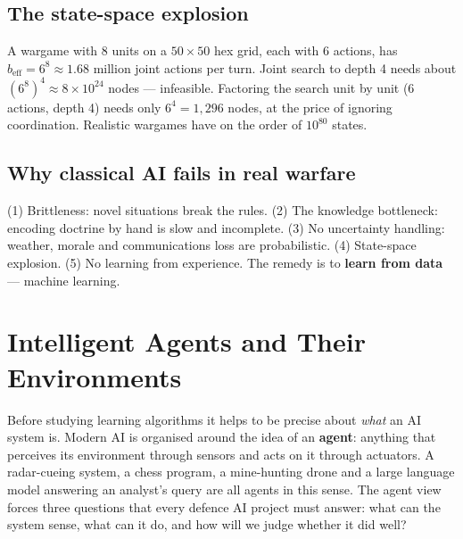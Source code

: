 \documentclass[11pt]{article}
\begin{document}
\subsection{The state-space explosion}
A wargame with 8 units on a $50\times50$ hex grid, each with 6 actions, has $b_{\text{eff}}=6^8\approx1.68$ million joint actions per turn. Joint search to depth 4 needs about $(6^8)^4\approx8\times10^{24}$ nodes --- infeasible. Factoring the search unit by unit (6 actions, depth 4) needs only $6^4=1{,}296$ nodes, at the price of ignoring coordination. Realistic wargames have on the order of $10^{80}$ states.

\subsection{Why classical AI fails in real warfare}
(1) Brittleness: novel situations break the rules. (2) The knowledge bottleneck: encoding doctrine by hand is slow and incomplete. (3) No uncertainty handling: weather, morale and communications loss are probabilistic. (4) State-space explosion. (5) No learning from experience. The remedy is to \textbf{learn from data} --- machine learning.

\section{Intelligent Agents and Their Environments}
Before studying learning algorithms it helps to be precise about \emph{what} an AI system is. Modern AI is organised around the idea of an \textbf{agent}: anything that perceives its environment through sensors and acts on it through actuators. A radar-cueing system, a chess program, a mine-hunting drone and a large language model answering an analyst's query are all agents in this sense. The agent view forces three questions that every defence AI project must answer: what can the system sense, what can it do, and how will we judge whether it did well?
\end{document}
